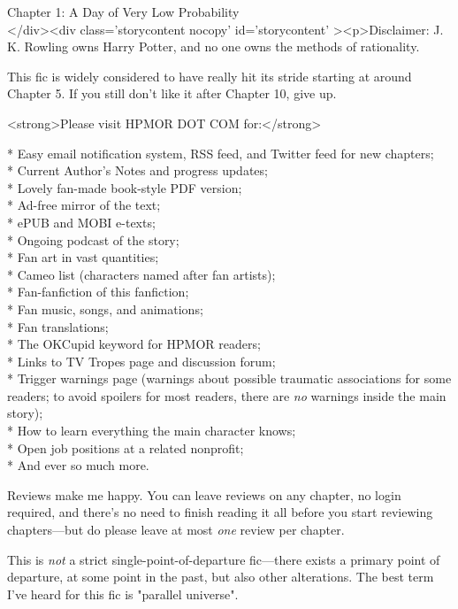 
Chapter 1: A Day of Very Low Probability\\
</div><div  class='storycontent nocopy' id='storycontent' ><p>Disclaimer: J. K. 
Rowling owns Harry Potter, and no one owns the methods of rationality.

This fic is widely considered to have really hit its stride starting at around 
Chapter 5. If you still don't like it after Chapter 10, give up.

<strong>Please visit HPMOR DOT COM for:</strong>

* Easy email notification system, RSS feed, and Twitter feed for new chapters;\\
* Current Author's Notes and progress updates;\\
* Lovely fan-made book-style PDF version;\\
* Ad-free mirror of the text;\\
* ePUB and MOBI e-texts;\\
* Ongoing podcast of the story;\\
* Fan art in vast quantities;\\
* Cameo list (characters named after fan artists);\\
* Fan-fanfiction of this fanfiction;\\
* Fan music, songs, and animations;\\
* Fan translations;\\
* The OKCupid keyword for HPMOR readers;\\
* Links to TV Tropes page and discussion forum;\\
* Trigger warnings page (warnings about possible traumatic associations for 
some readers; to avoid spoilers for most readers, there are \emph{no} warnings 
inside the main story);\\
* How to learn everything the main character knows;\\
* Open job positions at a related nonprofit;\\
* And ever so much more.

Reviews make me happy. You can leave reviews on any chapter, no login required, 
and there's no need to finish reading it all before you start reviewing 
chapters---but do please leave at most \emph{one} review per chapter.

This is \emph{not} a strict single-point-of-departure fic---there exists a 
primary point of departure, at some point in the past, but also other 
alterations. The best term I've heard for this fic is "parallel universe".

